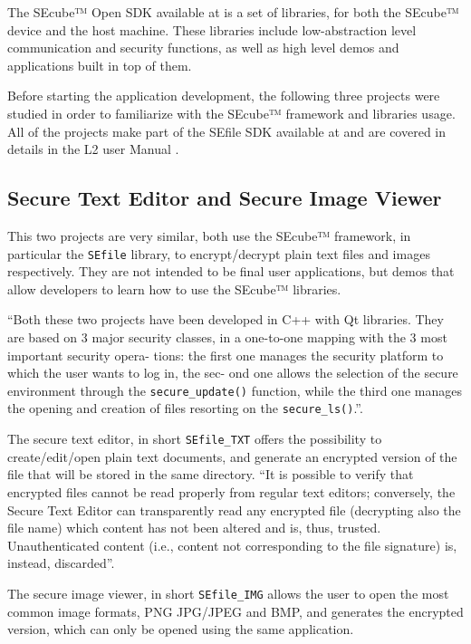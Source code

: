 The SEcube™ Open SDK available at \cite{SEcubeRes} is a set of libraries, for both the SEcube™ device and the host machine. These libraries include low-abstraction level communication and security functions, as well as high level demos and applications built in top of them.

Before starting the application development, the following three projects were studied in order to familiarize with the SEcube™ framework and libraries usage. All of the projects make part of the SEfile SDK available at \cite{SEcubeRes} and are covered in details in the L2 user Manual \cite{L2UserMan}.

\subsection{Secure Text Editor and Secure Image Viewer}

This two projects are very similar, both use the SEcube™ framework, in particular the \texttt{SEfile} library, to encrypt/decrypt plain text files and images respectively. They are not intended to be final user applications, but demos that allow developers to learn how to use the SEcube™ libraries.

``Both these two projects have been developed in C++ with Qt libraries. They are based on 3
major security classes, in a one-to-one mapping with the 3 most important security opera-
tions: the first one manages the security platform to which the user wants to log in, the sec-
ond one allows the selection of the secure environment through the \texttt{secure\_update()} function, while the third one manages the opening and creation of files resorting on the \texttt{secure\_ls()}.''\citep{L2UserMan}.

The secure text editor, in short \texttt{SEfile\_TXT} offers the possibility to create/edit/open plain text documents, and generate an encrypted version of the file that will be stored in the same directory. ``It is possible to verify that encrypted files cannot be read properly from regular text editors; conversely, the Secure Text Editor can transparently read any encrypted file (decrypting also the file name) which content has not been altered and is, thus, trusted. Unauthenticated content (i.e., content not corresponding to the file signature) is, instead, discarded''.

The secure image viewer, in short \texttt{SEfile\_IMG} allows the user to open the most common image formats, PNG JPG/JPEG and BMP, and generates the encrypted version, which can only be opened using the same application.

